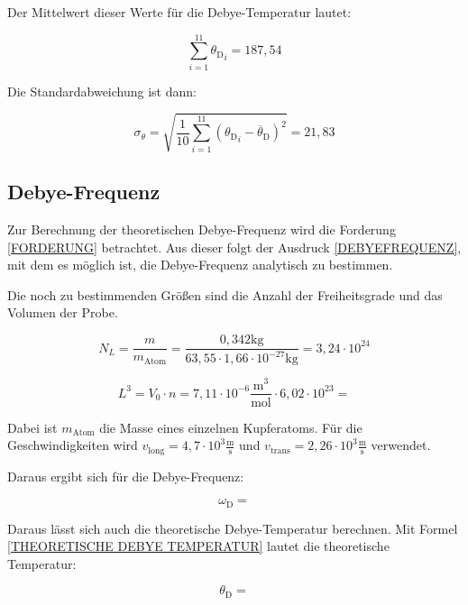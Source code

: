 \noindent Der Mittelwert dieser Werte für die Debye-Temperatur lautet:

\begin{equation}
\sum\limits_{i=1}^{11}{\theta_{\text{D}}}_i=187,54
\end{equation}

\noindent Die Standardabweichung ist dann:

\begin{equation}
\sigma_\theta=\sqrt{\frac{1}{10}\sum\limits_{i=1}^{11}({\theta_{\text{D}}}_i-\overline \theta_{\text{D}})^2}=21,83
\end{equation}

\subsection{Debye-Frequenz}
Zur Berechnung der theoretischen Debye-Frequenz wird die Forderung \ref{FORDERUNG} betrachtet. Aus dieser folgt der Ausdruck \ref{DEBYEFREQUENZ}, mit dem es möglich ist, die Debye-Frequenz analytisch zu bestimmen.

\noindent Die noch zu bestimmenden Größen sind die Anzahl der Freiheitsgrade und das Volumen der Probe.

\begin{equation*}
N_L=\frac{m}{m_\text{Atom}}=\frac{0,342\text{kg}}{63,55\cdot 1,66\cdot10^{-27}\text{kg}}=3,24\cdot10^{24}
\end{equation*}

\begin{equation*}
L^3=V_0\cdot n=7,11\cdot10^{-6}\frac{\text{m}^3}{\text{mol}}\cdot6,02\cdot10^{23}=
\end{equation*}

\noindent Dabei ist \(m_\text{Atom}\) die Masse eines einzelnen Kupferatoms. Für die Geschwindigkeiten wird \(v_\text{long}=4,7\cdot10^3\frac{\text{m}}{\text{s}}\) und \(v_\text{trans}=2,26\cdot10^3\frac{\text{m}}{\text{s}}\) verwendet.

\noindent Daraus ergibt sich für die Debye-Frequenz:

\begin{equation*}
\omega_\text{D}=
\end{equation*}

\noindent Daraus lässt sich auch die theoretische Debye-Temperatur berechnen. Mit Formel \ref{THEORETISCHE DEBYE TEMPERATUR} lautet die theoretische Temperatur:

\begin{equation*}
\theta_\text{D}=
\end{equation*}
